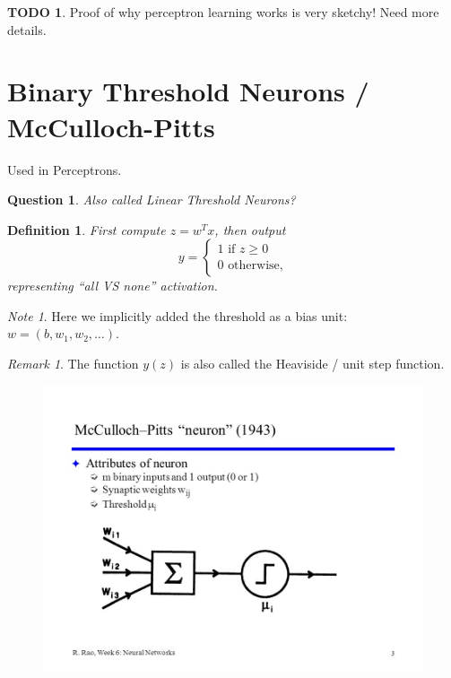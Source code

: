 \documentclass[12pt]{article}
\theoremstyle{plain}
\newtheorem{question}[theorem]{Question}
\newtheorem{definition}[theorem]{Definition}
\theoremstyle{definition}
\newtheorem{todo}{TODO}
\theoremstyle{remark}
\newtheorem{remark}[theorem]{Remark}
\newtheorem{note}[theorem]{Note}
\begin{document}
\begin{todo}
Proof of why perceptron learning works is very sketchy! Need more details.
\end{todo}

\section{Binary Threshold Neurons / McCulloch-Pitts}

Used in Perceptrons.

\begin{question}
Also called Linear Threshold Neurons?
\end{question}

\begin{definition}
First compute $z = w^T x$, then output $$y = \begin{cases}
1 \text{ if } z \geq 0 \\
0 \text{ otherwise,}
\end{cases}$$ representing ``all VS none'' activation.
\end{definition}

\begin{note}
Here we implicitly added the threshold as a bias unit: $w = (b, w_1, w_2, \ldots)$.
\end{note}

\begin{remark}
The function $y(z)$ is also called the Heaviside / unit step function.
\end{remark}

\begin{figure}[H]
\centering
\includegraphics[width=1.0\textwidth]{mccullochpitts}
\end{figure}
\end{document}
